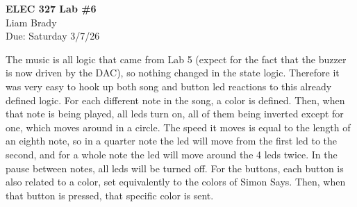 \documentclass[12pt]{article}
\begin{document}
\begin{center}
\textbf{ELEC 327 Lab \#6} \\[6pt]
Liam Brady \\
Due: Saturday 3/7/26
\end{center}

The music is all logic that came from Lab 5 (expect for the fact that the buzzer is now driven by the DAC), so nothing changed in the state logic. Therefore it was very easy to hook up both song and button led reactions to this already defined logic.
\indent For each different note in the song, a color is defined. Then, when that note is being played, all leds turn on, all of them being inverted except for one, which moves around in a circle. The speed it moves is equal to the length of an eighth note, so in a quarter note the led will move from the first led to the second, and for a whole note the led will move around the 4 leds twice. In the pause between notes, all leds will be turned off.
\indent For the buttons, each button is also related to a color, set equivalently to the colors of Simon Says. Then, when that button is pressed, that specific color is sent.
\end{document}

